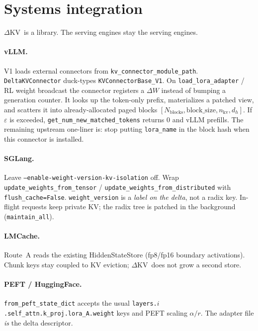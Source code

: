 \documentclass{article}
\newcommand{\dkv}{$\Delta$KV}
\begin{document}
\section{Systems integration}
\label{sec:systems}

\dkv\ is a library.
The serving engines stay the serving engines.

\paragraph{vLLM.}
V1 loads external connectors from
\texttt{kv\_connector\_module\_path}.
\texttt{DeltaKVConnector} duck-types \texttt{KVConnectorBase\_V1}.
On \texttt{load\_lora\_adapter} / RL weight broadcast the connector
registers a $\Delta W$ instead of bumping a generation counter.
It looks up the token-only prefix, materializes a patched view, and
scatters it into already-allocated paged blocks
$[N_{\mathrm{blocks}},\mathrm{block\_size},n_{\mathrm{kv}},d_h]$.
If $\varepsilon$ is exceeded, \texttt{get\_num\_new\_matched\_tokens}
returns $0$ and vLLM prefills.
The remaining upstream one-liner is: stop putting \texttt{lora\_name} in
the block hash when this connector is installed.

\paragraph{SGLang.}
Leave \texttt{--enable-weight-version-kv-isolation} off.
Wrap \texttt{update\_weights\_from\_tensor} /
\texttt{update\_weights\_from\_distributed} with
\texttt{flush\_cache=False}.
\texttt{weight\_version} is a \emph{label on the delta}, not a radix key.
In-flight requests keep private KV; the radix tree is patched in the
background (\texttt{maintain\_all}).

\paragraph{LMCache.}
Route~A reads the existing HiddenStateStore (fp8/fp16 boundary
activations).
Chunk keys stay coupled to KV eviction; \dkv\ does not grow a second store.

\paragraph{PEFT / HuggingFace.}
\texttt{from\_peft\_state\_dict} accepts the usual
\texttt{layers.$i$.self\_attn.k\_proj.lora\_A.weight} keys and PEFT
scaling $\alpha/r$.
The adapter file \emph{is} the delta descriptor.
\end{document}
